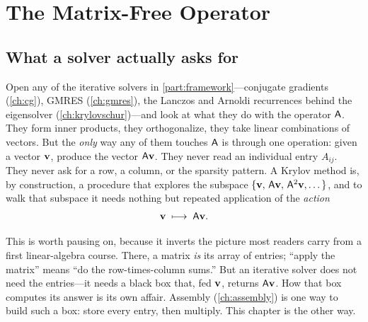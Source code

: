 \chapter{The Matrix-Free Operator}
\label{ch:matrixfree}


\section{What a solver actually asks for}
\label{sec:mf-whatask}

Open any of the iterative solvers in \cref{part:framework}---conjugate
gradients (\cref{ch:cg}), GMRES (\cref{ch:gmres}), the Lanczos and Arnoldi
recurrences behind the eigensolver (\cref{ch:krylovschur})---and look at what
they do with the operator $\mathsf{A}$. They form inner products, they orthogonalize,
they take linear combinations of vectors. But the \emph{only} way any of them
touches $\mathsf{A}$ is through one operation: given a vector $\mathbf{v}$, produce the
vector $\mathsf{A}\mathbf{v}$. They never read an individual entry $A_{ij}$. They never ask
for a row, a column, or the sparsity pattern. A Krylov method is, by
construction, a procedure that explores the subspace
$\{\mathbf{v},\,\mathsf{A}\mathbf{v},\,\mathsf{A}^2\mathbf{v},\dots\}$, and to walk that subspace it needs
nothing but repeated application of the \emph{action}
\[
  \mathbf{v} \;\longmapsto\; \mathsf{A}\mathbf{v} .
\]

This is worth pausing on, because it inverts the picture most readers carry from
a first linear-algebra course. There, a matrix \emph{is} its array of entries;
``apply the matrix'' means ``do the row-times-column sums.'' But an
iterative solver does not need the entries---it needs a black box that, fed
$\mathbf{v}$, returns $\mathsf{A}\mathbf{v}$. How that box computes its answer is its own affair.
Assembly (\cref{ch:assembly}) is one way to build such a box: store every entry,
then multiply. This chapter is the other way.

